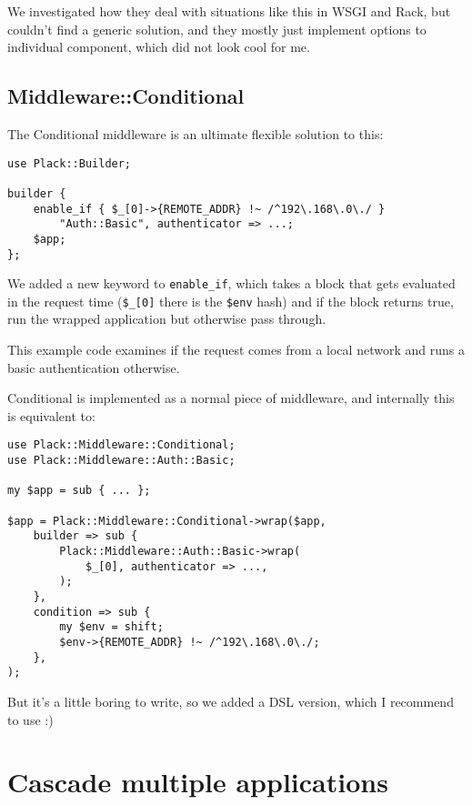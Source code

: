 We investigated how they deal with situations like this in WSGI and
Rack, but couldn't find a generic solution, and they mostly just
implement options to individual component, which did not look cool for
me.

\section{Middleware::Conditional}\label{middlewareconditional}

The Conditional middleware is an ultimate flexible solution to this:

\begin{lstlisting}
use Plack::Builder;

builder {
    enable_if { $_[0]->{REMOTE_ADDR} !~ /^192\.168\.0\./ }
        "Auth::Basic", authenticator => ...;
    $app;
};
\end{lstlisting}

We added a new keyword to  \lstinline!enable_if!, which
takes a block that gets evaluated in the request time (\lstinline!$_[0]!
there is the \lstinline!$env! hash) and if the block returns true, run
the wrapped application but otherwise pass through.

This example code examines if the request comes from a local network and
runs a basic authentication otherwise.

Conditional is implemented as a normal piece of middleware, and
internally this is equivalent to:

\begin{lstlisting}
use Plack::Middleware::Conditional;
use Plack::Middleware::Auth::Basic;

my $app = sub { ... };

$app = Plack::Middleware::Conditional->wrap($app,
    builder => sub {
        Plack::Middleware::Auth::Basic->wrap(
            $_[0], authenticator => ...,
        );
    },
    condition => sub {
        my $env = shift;
        $env->{REMOTE_ADDR} !~ /^192\.168\.0\./;
    },
);
\end{lstlisting}

But it's a little boring to write, so we added a DSL version, which I
recommend to use :)

\chapter{Cascade multiple
applications}\label{day-19-cascade-multiple-applications}

